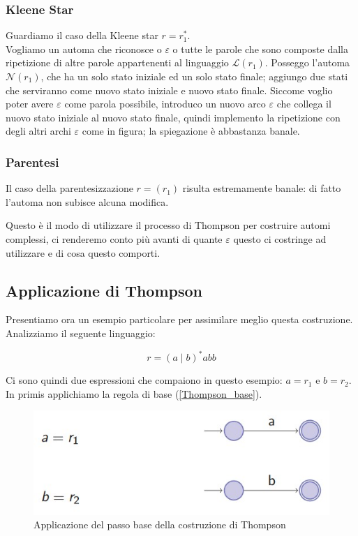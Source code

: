 \documentclass[class=book, crop=false, oneside, 12pt]{standalone}
\begin{document}
\subsubsection{Kleene Star}
Guardiamo il caso della Kleene star \(r = r_1^*\).\\
Vogliamo un automa che riconosce o \(\varepsilon\) o tutte le parole che sono composte dalla ripetizione di altre parole appartenenti al linguaggio \(\mathcal{L}(r_1)\).
Posseggo l’automa \(\mathcal{N}(r_1)\), che ha un solo stato iniziale ed un solo stato finale; aggiungo due stati che serviranno come nuovo stato iniziale e nuovo stato finale.
Siccome voglio poter avere \(\varepsilon\) come parola possibile, introduco un nuovo arco \(\varepsilon\) che collega il nuovo stato iniziale al nuovo stato finale, quindi implemento la ripetizione con degli altri archi \(\varepsilon\) come in figura; la spiegazione è abbastanza banale.

\subsubsection{Parentesi}
Il caso della parentesizzazione \(r = ( r_1 )\) risulta estremamente banale: di fatto l'automa non subisce alcuna modifica.

Questo è il modo di utilizzare il processo di Thompson per costruire automi complessi, ci renderemo conto più avanti di quante \(\varepsilon\) questo ci costringe ad utilizzare e di cosa questo comporti.

\subsection{Applicazione di Thompson}
Presentiamo ora un esempio particolare per assimilare meglio questa costruzione. Analizziamo il seguente linguaggio:

\begin{equation}
    r = (a \mid b)^\ast abb
\end{equation}

\noindent Ci sono quindi due espressioni che compaiono in questo esempio: \(a = r_1\) e \(b = r_2\).
In primis applichiamo la regola di base (\ref{Thompson_base}).

\begin{figure}
    \centering
    \includegraphics[width=.7\textwidth,keepaspectratio]{esempio_Thompson_0}
    \caption{Applicazione del passo base della costruzione di Thompson}
    \label{esempio_Thompson_0}
\end{figure}
\end{document}
